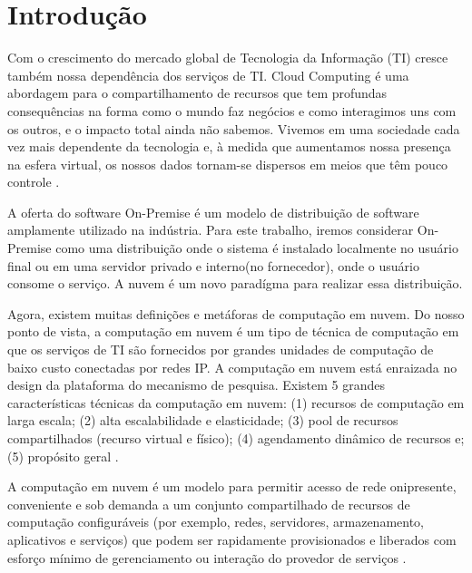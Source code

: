 \chapter[Introdução]{Introdução}
\label{cap:introducao}

Com o crescimento do mercado global de Tecnologia da Informação (TI) cresce também nossa dependência dos serviços de TI. Cloud Computing é uma abordagem para o compartilhamento de recursos que tem profundas consequências na forma como o mundo faz negócios e como
interagimos uns com os outros, e o impacto total ainda não sabemos. Vivemos em uma sociedade cada vez mais dependente da tecnologia e, à medida que aumentamos nossa presença na esfera
virtual, os nossos dados tornam-se dispersos em meios que têm pouco controle \cite{veras2012}.

A oferta do software On-Premise é um modelo de distribuição de software amplamente utilizado na indústria. Para este trabalho, iremos considerar On-Premise como uma distribuição onde o sistema é instalado localmente no usuário final ou em uma servidor privado e interno(no fornecedor), onde o usuário consome o serviço. A nuvem é um novo paradígma para realizar essa distribuição.


Agora, existem muitas definições e metáforas de computação em nuvem. Do nosso ponto de vista, a computação em nuvem é um tipo de técnica de computação em que os serviços de TI são fornecidos por grandes unidades de computação de baixo custo conectadas por redes IP. A computação em nuvem está enraizada no design da plataforma do mecanismo de pesquisa. Existem 5 grandes características técnicas da computação em nuvem: (1) recursos de computação em larga escala; (2) alta escalabilidade e elasticidade; (3) pool de recursos compartilhados (recurso virtual e físico); (4) agendamento dinâmico de recursos e; (5) propósito geral
\cite{qian2009}.

A computação em nuvem é um modelo para permitir acesso de rede onipresente, conveniente e sob demanda a um conjunto compartilhado de recursos de computação configuráveis (por exemplo, redes, servidores, armazenamento, aplicativos e serviços) que podem ser rapidamente provisionados e liberados com esforço mínimo de gerenciamento ou interação do provedor de serviços \cite{WPcloud}.

